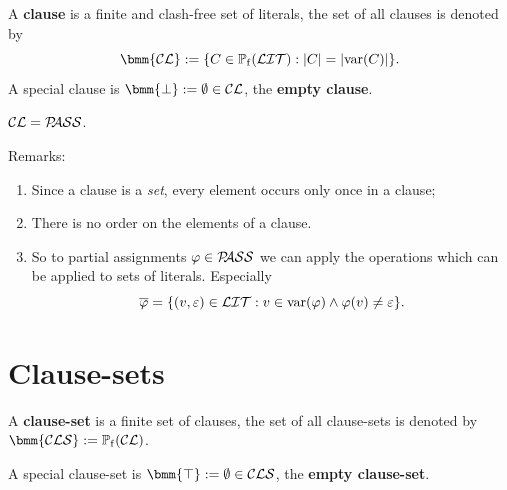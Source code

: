 \documentclass[12pt]{book}
\begin{document}
\begin{defi}\label{def:cl}
  A \textbf{clause} is a finite and clash-free set of literals, the set of all clauses is denoted by
  \begin{displaymath}
    \bmm{\Cl} := \set{C \in \pote(\Lit) : \abs{C} = \abs{\var(C)}}.
  \end{displaymath}
  A special clause is $\bmm{\bot} := \es \in \Cl$, the \textbf{empty clause}.
\end{defi}

\begin{lem}\label{lem::CLPASS}
  $\mathcal{CL} = \mathcal{P\hspace{-0.32em}ASS}$.
\end{lem}
Remarks:
\begin{enumerate}
\item Since a clause is a \textit{set}, every element occurs only once in a clause;
\item There is no order on the elements of a clause.
\item So to partial assignments $\varphi \in \mathcal{P\hspace{-0.32em}ASS}$ we can apply the operations which can be applied to sets of literals. Especially
  \begin{displaymath}
    \overline{\varphi} = \{ (v,\varepsilon) \in \mathcal{LIT} : v \in \operatorname{var}(\varphi) \wedge \varphi(v) \ne \varepsilon \}.
  \end{displaymath}
\end{enumerate}

\section{Clause-sets}
\label{sec:cls}

\begin{defi}\label{def:cls}
  A \textbf{clause-set} is a finite set of clauses, the set of all clause-sets is denoted by $\bmm{\Cls} := \pote(\Cl)$.

  A special clause-set is $\bmm{\top} := \es \in \Cls$, the \textbf{empty clause-set}.
\end{defi}
\end{document}
